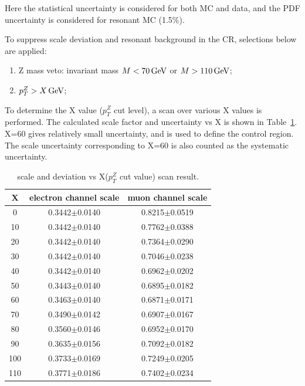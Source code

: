 Here the statistical uncertainty is considered for both MC and data, and the PDF uncertainty is considered for resonant MC (1.5\%).

\vspace{0.3cm}
To suppress scale deviation and resonant background in the CR, selections below are applied: 
\begin{enumerate}
\item Z mass veto: invariant mass $M<70\,\text{Ge\hspace{-.08em}V}$ or $M>110\,\text{Ge\hspace{-.08em}V}$; 
\item $p_{T}^{Z} > X\,\text{Ge\hspace{-.08em}V}$;
\end{enumerate}

To determine the X value ($p_{T}^{Z}$ cut level), a scan over various X values is performed. The calculated scale factor and uncertainty vs X is shown in Table~\ref{tab:nonressfdev}. X=60 gives relatively small uncertainty, and is used to define the control region. The scale uncertainty corresponding to X=60 is also counted as the systematic uncertainty.

\begin{table}[htbp]
  \begin{center}
    \caption{
      scale and deviation vs X($p_{T}^{Z}$ cut value) scan result.      
      \label{tab:nonressfdev}}
    \begin{tabular}{c c c}
      \hline\hline
      X & electron channel scale & muon channel scale\\
      \hline
      0  & 0.3442$\pm$0.0140 & 0.8215$\pm$0.0519 \\
      10 & 0.3442$\pm$0.0140 & 0.7762$\pm$0.0388 \\
      20 & 0.3442$\pm$0.0140 & 0.7364$\pm$0.0290 \\
      30 & 0.3442$\pm$0.0140 & 0.7046$\pm$0.0238 \\
      40 & 0.3442$\pm$0.0140 & 0.6962$\pm$0.0202 \\
      50 & 0.3443$\pm$0.0140 & 0.6895$\pm$0.0182 \\
      60 & 0.3463$\pm$0.0140 & 0.6871$\pm$0.0171 \\
      70 & 0.3490$\pm$0.0142 & 0.6907$\pm$0.0167 \\
      80 & 0.3560$\pm$0.0146 & 0.6952$\pm$0.0170 \\
      90 & 0.3635$\pm$0.0156 & 0.7092$\pm$0.0182 \\
      100 & 0.3733$\pm$0.0169 & 0.7249$\pm$0.0205 \\
      110 & 0.3771$\pm$0.0186 & 0.7402$\pm$0.0234 \\
      \hline\hline
    \end{tabular}
  \end{center}
\end{table}

